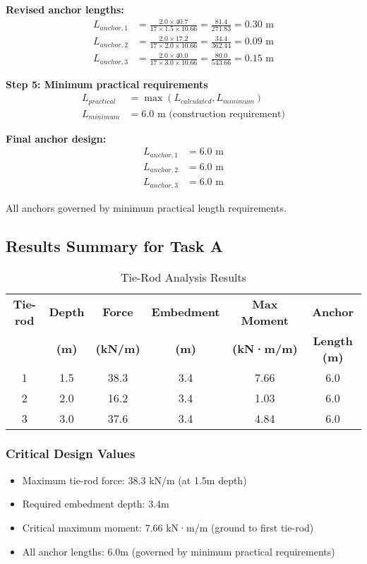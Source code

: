 \documentclass[10pt,a4paper,twocolumn]{article}
\begin{document}
\textbf{Revised anchor lengths:}
\begin{align}
L_{anchor,1} &= \frac{2.0 \times 40.7}{17 \times 1.5 \times 10.66} = \frac{81.4}{271.83} = 0.30 \text{ m} \\
L_{anchor,2} &= \frac{2.0 \times 17.2}{17 \times 2.0 \times 10.66} = \frac{34.4}{362.44} = 0.09 \text{ m} \\
L_{anchor,3} &= \frac{2.0 \times 40.0}{17 \times 3.0 \times 10.66} = \frac{80.0}{543.66} = 0.15 \text{ m}
\end{align}

\textbf{Step 5: Minimum practical requirements}
\begin{align}
L_{practical} &= \max(L_{calculated}, L_{minimum}) \\
L_{minimum} &= 6.0 \text{ m (construction requirement)}
\end{align}

\textbf{Final anchor design:}
\begin{align}
L_{anchor,1} &= 6.0 \text{ m} \\
L_{anchor,2} &= 6.0 \text{ m} \\
L_{anchor,3} &= 6.0 \text{ m}
\end{align}

All anchors governed by minimum practical length requirements.

\subsection{Results Summary for Task A}


\begin{table}[h]
\centering
\caption{Tie-Rod Analysis Results}
\begin{tabular}{@{}cccccc@{}}
\toprule
\textbf{Tie-rod} & \textbf{Depth} & \textbf{Force} & \textbf{Embedment} & \textbf{Max Moment} & \textbf{Anchor} \\
& \textbf{(m)} & \textbf{(kN/m)} & \textbf{(m)} & \textbf{(kN·m/m)} & \textbf{Length (m)} \\
\midrule
1 & 1.5 & 38.3 & 3.4 & 7.66 & 6.0 \\
2 & 2.0 & 16.2 & 3.4 & 1.03 & 6.0 \\
3 & 3.0 & 37.6 & 3.4 & 4.84 & 6.0 \\
\bottomrule
\end{tabular}
\end{table}

\subsubsection{Critical Design Values}
\begin{itemize}
\item Maximum tie-rod force: 38.3 kN/m (at 1.5m depth)
\item Required embedment depth: 3.4m
\item Critical maximum moment: 7.66 kN·m/m (ground to first tie-rod)
\item All anchor lengths: 6.0m (governed by minimum practical requirements)
\end{itemize}
\end{document}
